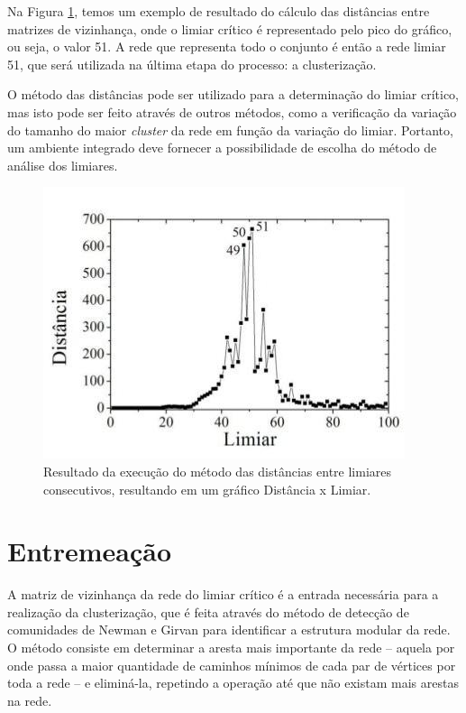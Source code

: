 Na Figura \ref{fig:distancia}, temos um exemplo de resultado do cálculo das distâncias entre matrizes de vizinhança, onde o limiar crítico é representado
pelo pico do gráfico, ou seja, o valor 51. A rede que representa todo o conjunto é então a rede limiar 51, que será utilizada na última etapa do processo:
a clusterização.

O método das distâncias pode ser utilizado para a determinação do limiar crítico, mas isto pode ser feito através de outros métodos, como a verificação da
variação do tamanho do maior \textit{cluster} da rede em função da variação do limiar. Portanto, um ambiente integrado deve fornecer a possibilidade de
escolha do método de análise dos limiares.

\begin{figure}
\centering
\includegraphics[scale=0.58]{distancia}
\caption{Resultado da execução do método das distâncias entre limiares consecutivos, resultando em um gráfico Distância x Limiar.}
\label{fig:distancia}
\end{figure}

\section{Entremeação} \label{sec:entremeacao}

A matriz de vizinhança da rede do limiar crítico é a entrada necessária para a realização da clusterização, que é feita através do método de detecção
de comunidades de Newman e Girvan \cite{newman2004} para identificar a estrutura modular da rede. O método consiste em determinar a aresta mais importante
da rede – aquela por onde passa a maior quantidade de caminhos mínimos de cada par de vértices por toda a rede – e eliminá-la, repetindo a operação
até que não existam mais arestas na rede.

